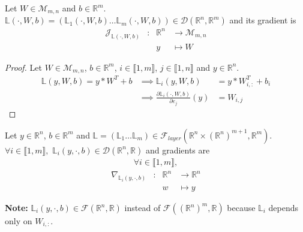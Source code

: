 \documentclass[11pt,en]{elegantpaper}
\newcommand{\Real}{\mathbb{R}}
\begin{document}
\begin{proposition}
  {\normalfont
    Let $W \in \mathcal{M}_{m,n}$ and $b \in \Real^m$.
    $\mathbb{L}(\cdot,W,b) = (\mathbb{L}_1(\cdot,W,b) \ldots \mathbb{L}_m(\cdot,W,b)) \in \mathcal{D}(\Real^n, \Real^m)$
    and its gradient is \begin{equation} \label{prop:densel_y_differential}
      \begin{array}{llll}
        \mathcal{J}_{\mathbb{L}(\cdot,W,b)} & : & \Real^n  & \longrightarrow \mathcal{M}_{m,n} \\
        &   & y & \longmapsto W
      \end{array}
    \end{equation}
  }
\end{proposition}

\begin{proof}
  Let $W \in \mathcal{M}_{m,n}$, $b \in \Real^m$, $i \in \llbracket 1,m \rrbracket$, $j \in \llbracket 1,n \rrbracket$
  and $y \in \Real^n$. \begin{equation*}
    \begin{array}{lll}
      \mathbb{L}(y,W,b) = y * W^T + b & \implies \mathbb{L}_i(y,W,b) & = y * W_{i,:}^T + b_i \\
      & \implies \frac{\partial \mathbb{L}_i(\cdot,W,b)}{\partial e_j} (y) & = W_{i,j}
    \end{array}
  \end{equation*}
\end{proof}

\begin{proposition}
  {\normalfont
    Let $y \in \Real^n$, $b \in \Real^m$ and
    $\mathbb{L} = (\mathbb{L}_1 \ldots \mathbb{L}_m) \in \mathcal{F}_{layer}(\Real^n \times (\Real^n)^{m+1},\Real^m)$.
    $\forall i \in \llbracket 1,m \rrbracket,$ $\mathbb{L}_i(y,\cdot,b) \in \mathcal{D}(\Real^n, \Real)$
    and gradients are \begin{equation*}
      \begin{gathered}
        \forall i \in \llbracket 1,m \rrbracket,
      \end{gathered}
    \end{equation*}
    \begin{equation} \label{prop:densel_W_differential}
      \begin{array}{llll}
        \nabla_{\mathbb{L}_i(y,\cdot,b)} & : & \Real^n  & \longrightarrow \Real^n \\
        &   & w & \longmapsto y
      \end{array}
    \end{equation} \par
    \textbf{Note:} $\mathbb{L}_i(y,\cdot,b) \in \mathcal{F}(\Real^n, \Real)$ instead of $\mathcal{F}((\Real^n)^m, \Real)$
    because $\mathbb{L}_i$ depends only on $W_{i,:}$.
  }
\end{proposition}
\end{document}
